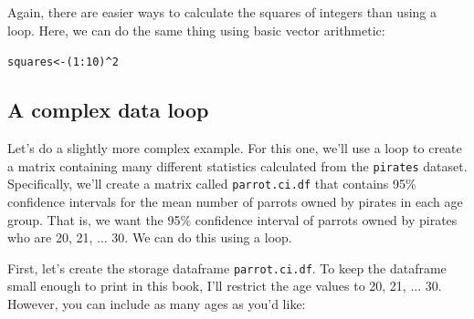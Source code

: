 \documentclass{tufte-book}\usepackage[]{graphicx}\usepackage[]{color}
\makeatletter
\newcommand{\hlnum}[1]{\textcolor[rgb]{0.686,0.059,0.569}{#1}}%
\newcommand{\hlopt}[1]{\textcolor[rgb]{0,0,0}{#1}}%
\newcommand{\hlstd}[1]{\textcolor[rgb]{0.345,0.345,0.345}{#1}}%
\newcommand{\hlkwb}[1]{\textcolor[rgb]{0.69,0.353,0.396}{#1}}%
\newenvironment{kframe}{%
 \def\at@end@of@kframe{}%
 \ifinner\ifhmode%
  \def\at@end@of@kframe{\end{minipage}}%
  \begin{minipage}{\columnwidth}%
 \fi\fi%
 \def\FrameCommand##1{\hskip\@totalleftmargin \hskip-\fboxsep
 \colorbox{shadecolor}{##1}\hskip-\fboxsep
     \hskip-\linewidth \hskip-\@totalleftmargin \hskip\columnwidth}%
 \MakeFramed {\advance\hsize-\width
   \@totalleftmargin\z@ \linewidth\hsize
   \@setminipage}}%
 {\par\unskip\endMakeFramed%
 \at@end@of@kframe}
\newenvironment{knitrout}{}{} %
\makeatother
\begin{document}
\begin{marginfigure}
Again, there are easier ways to calculate the squares of integers than using a loop. Here, we can do the same thing using basic vector arithmetic:
\begin{knitrout}
\color{fgcolor}\begin{kframe}
\begin{alltt}
\hlstd{squares} \hlkwb{<-} \hlstd{(}\hlnum{1}\hlopt{:}\hlnum{10}\hlstd{)} \hlopt{^} \hlnum{2}
\end{alltt}
\end{kframe}
\end{knitrout}
\end{marginfigure}

\subsection{A complex data loop}

Let's do a slightly more complex example. For this one, we'll use a loop to create a matrix containing many different statistics calculated from the \texttt{pirates} dataset. Specifically, we'll create a matrix called \texttt{parrot.ci.df} that contains  95\% confidence intervals for the mean number of parrots owned by pirates in each age group. That is, we want the 95\% confidence interval of parrots owned by pirates who are 20, 21, ... 30. We can do this using a loop.


First, let's create the storage dataframe \texttt{parrot.ci.df}. To keep the dataframe small enough to print in this book, I'll restrict the age values to 20, 21, ... 30. However, you can include as many ages as you'd like:

\pagebreak

\end{document}
